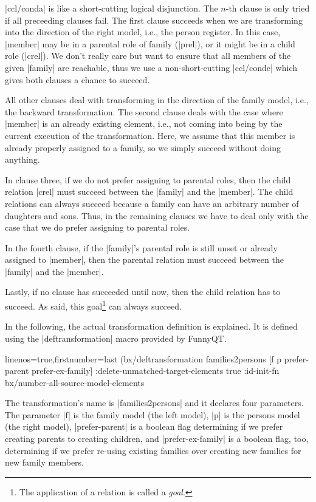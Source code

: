 \documentclass[a4paper]{article}
\newcommand{\code}{\clojureinline}
\begin{document}
\code|ccl/conda| is like a short-cutting logical disjunction.  The \(n\)-th
clause is only tried if all preceeding clauses fail.  The first clause succeeds
when we are transforming into the direction of the right model, i.e., the
person register.  In this case, \code|member| may be in a parental role of
family (\code|prel|), or it might be in a child role (\code|crel|).  We don't
really care but want to ensure that all members of the given \code|family| are
reachable, thus we use a non-short-cutting \code|ccl/conde| which gives both
clauses a chance to succeed.

All other clauses deal with transforming in the direction of the family model,
i.e., the backward transformation.  The second clause deals with the case where
\code|member| is an already existing element, i.e., not coming into being by
the current execution of the transformation.  Here, we assume that this member
is already properly assigned to a family, so we simply succeed without doing
anything.

In clause three, if we do not prefer assigning to parental roles, then the
child relation \code|crel| must succeed between the \code|family| and the
\code|member|.  The child relations can always succeed because a family can
have an arbitrary number of daughters and sons.  Thus, in the remaining clauses
we have to deal only with the case that we do prefer assigning to parental
roles.

In the fourth clause, if the \code|family|'s parental role is still unset or
already assigned to \code|member|, then the parental relation must succeed
between the \code|family| and the \code|member|.

Lastly, if no clause has succeeded until now, then the child relation has to
succeed.  As said, this goal\footnote{The application of a relation is called a
  \emph{goal}.} can always succeed.

\bigskip{}

In the following, the actual transformation definition is explained.  It is
defined using the \code|deftransformation| macro provided by FunnyQT.

\begin{clojurecode*}{linenos=true,firstnumber=last}
(bx/deftransformation families2persons [f p prefer-parent prefer-ex-family]
  :delete-unmatched-target-elements true
  :id-init-fn bx/number-all-source-model-elements
\end{clojurecode*}

The transformation's name is \code|families2persons| and it declares four
parameters.  The parameter \code|f| is the family model (the left model),
\code|p| is the persons model (the right model), \code|prefer-parent| is a
boolean flag determining if we prefer creating parents to creating children,
and \code|prefer-ex-family| is a boolean flag, too, determining if we prefer
re-using existing families over creating new families for new family members.
\end{document}
